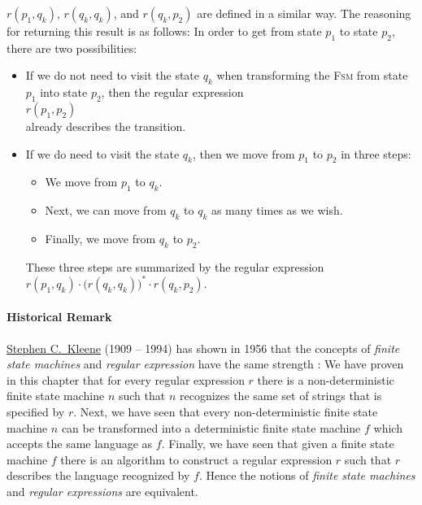 \begin{enumerate}
\begin{enumerate}
            $r(p_1,q_k)$, $r(q_k,q_k)$, and $r(q_k,p_2)$ are defined in a similar way.
            The reasoning for returning this result is as follows:  In order to get from
            state $p_1$ to state $p_2$, there are two possibilities:
            \begin{itemize}
            \item If we do not need to visit the state $q_k$ when transforming  the \textsc{Fsm}
                  from state $p_1$ into state $p_2$, then the regular expression
                  \\[0.2cm]
                  \hspace*{1.3cm}
                  $r(p_1,p_2)$
                  \\[0.2cm]
                  already describes the transition.
            \item If we do need to visit the state $q_k$, then we move from $p_1$ to $p_2$
                  in three steps:
                  \begin{itemize}
                  \item We move from $p_1$ to $q_k$.
                  \item Next, we can move from $q_k$ to $q_k$ as many times as we wish.
                  \item Finally, we move from $q_k$ to $p_2$.
                  \end{itemize}
                  These three steps are summarized by the regular expression
                  \\[0.2cm]
                  \hspace*{1.3cm}
                  $r(p_1,q_k) \cdot \bigl(r(q_k,q_k)\bigr)^* \cdot r(q_k,p_2)$.
            \end{itemize}
      \end{enumerate}
\end{enumerate}


\paragraph{Historical Remark}
\href{http://en.wikipedia.org/wiki/Stephen_Cole_Kleene}{Stephen C.~Kleene} (1909 -- 1994) has shown in 1956 that the concepts of 
\emph{finite state  machines} and \emph{regular expression} have the same strength
\cite{kleene:1956}:  We have proven in this chapter that for every regular expression $r$ there is a
non-deterministic finite state machine $n$ such that $n$ recognizes the same set of strings that is
specified by $r$.  Next, we have seen that every non-deterministic finite state machine $n$ can be
transformed into a deterministic finite state machine $f$ which accepts the same language as $f$.
Finally, we have seen that given a finite state machine $f$ there is an algorithm to construct a
regular expression $r$ such that $r$ describes the language recognized by $f$.
Hence the notions of \emph{finite state machines} and \emph{regular expressions} are equivalent.


